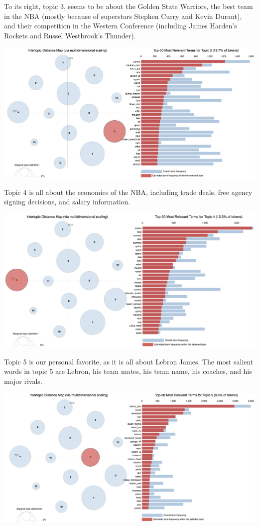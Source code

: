 \documentclass[11pt]{article}
\begin{document}
To its right, topic 3, seems to be about the Golden State Warriors, the best team in the NBA (mostly because of superstars Stephen Curry and Kevin Durant), and their competition in the Western Conference (including James Harden's Rockets and Russel Westbrook's Thunder). 

\includegraphics[width=470pt]{3.png} 

Topic 4 is all about the economics of the NBA, including trade deals, free agency signing decisions, and salary information.

\includegraphics[width=470pt]{4.png} 

Topic 5 is our personal favorite, as it is all about Lebron James.  The most salient words in topic 5 are Lebron, his team mates, his team name, his coaches, and his major rivals.  

\includegraphics[width=470pt]{5.png} 
\end{document}
